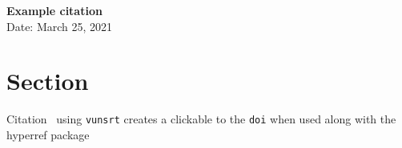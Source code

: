 \documentclass[10pt]{article}
\begin{document}
\begin{center}
{\bf Example citation} \\
    Date: March 25, 2021
\end{center}


\section{Section}
Citation~\cite{AuthorYear} using {\tt vunsrt} creates a clickable to the 
{\tt doi} when used along with the hyperref package 




\end{document}
